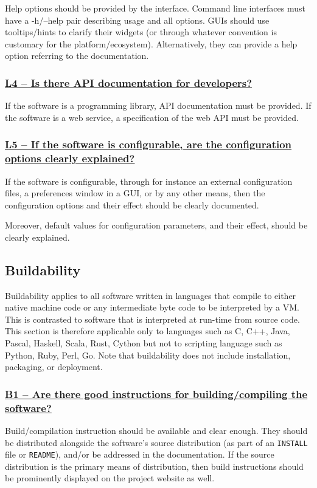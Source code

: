\documentclass[a4paper,11pt]{article}
\newcommand{\indicator}[1]{\subsubsection*{\underline{#1}}}
\begin{document}
Help options should be provided by the interface. Command line interfaces must
have a -h/--help pair describing usage and all options. GUIs should use tooltips/hints to clarify
their widgets (or through whatever convention is customary for the
platform/ecosystem). Alternatively, they can provide a help option referring to
the documentation.

\indicator{L4 -- Is there API documentation for developers?}

If the software is a programming library, API documentation must be provided.
If the software is a web service, a specification of the web API must be provided.

\indicator{L5 -- If the software is configurable, are the configuration
options clearly explained?}

%
%

If the software is configurable, through for instance an external configuration
files, a preferences window in a GUI, or by any other means, then the
configuration options and their effect should be clearly documented.

Moreover, default values for configuration parameters, and their effect, should be
clearly explained.

\subsection{Buildability}

Buildability applies to all software written in languages that compile to
either native machine code or any intermediate byte code to be interpreted by a VM.
This is contrasted to software that is interpreted at run-time from source
code. This section is therefore applicable only to languages such as C, C++,
Java, Pascal, Haskell, Scala, Rust, Cython but not to scripting language such
as Python, Ruby, Perl, Go.  Note that buildability does not include
installation, packaging, or deployment.

\indicator{B1 -- Are there good instructions for building/compiling the software?}

Build/compilation instruction should be available and clear enough. They should
be distributed alongside the software's source distribution (as part of an
\texttt{INSTALL} file or \texttt{README}), and/or be addressed in the documentation. If the
source distribution is the primary means of distribution, then build
instructions should be prominently displayed on the project website as well.
\end{document}
